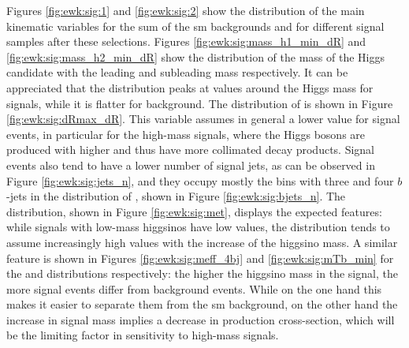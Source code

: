 Figures \ref{fig:ewk:sig:1} and \ref{fig:ewk:sig:2}  show the distribution of the main kinematic variables for 
the sum of the \gls{sm} backgrounds and for different signal samples after these selections.
Figures \ref{fig:ewk:sig:mass_h1_min_dR} and \ref{fig:ewk:sig:mass_h2_min_dR} show the distribution of the mass of the Higgs 
candidate with the leading and subleading mass respectively. 
It can be appreciated that the distribution peaks at values around the Higgs mass for 
signals, while it is flatter for background. 
The distribution of \dRmax is shown in Figure \ref{fig:ewk:sig:dRmax_dR}. This variable assumes in general a lower value for 
signal events, in particular for the high-mass signals, where the Higgs bosons are produced with higher \pt and thus have 
more collimated decay products. Signal events also tend to have a lower number of signal jets, as can be observed in Figure 
\ref{fig:ewk:sig:jets_n}, and they occupy mostly the bins with three and four $b$-jets in the 
distribution of \nbjet, shown in Figure \ref{fig:ewk:sig:bjets_n}. 
The \met distribution, shown in Figure \ref{fig:ewk:sig:met}, displays the expected features: while signals with low-mass higgsinos 
have low \met values, the distribution tends to assume increasingly high values with the increase of the higgsino mass. 
A similar feature is shown in Figures \ref{fig:ewk:sig:meff_4bj} and \ref{fig:ewk:sig:mTb_min} for the \meffb and \mtb distributions respectively: 
the higher the higgsino mass in the signal, the more signal events differ from background events. 
While on the one hand this makes it easier to separate them from the \gls{sm} background, on the other hand the increase in signal mass 
implies a decrease in production cross-section, which will be the limiting factor in sensitivity to high-mass signals. 

